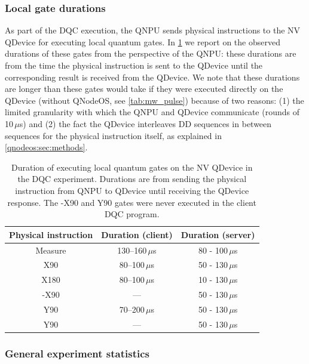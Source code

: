 \subsubsection{Local gate durations}

As part of the \ac{DQC} execution, the \ac{QNPU} sends physical instructions to the \ac{NV} \ac{QDevice} for executing local quantum gates. In \cref{tab:gate_durations} we report on the observed durations of these gates from the perspective of the \ac{QNPU}: these durations are from the time the physical instruction is sent to the \ac{QDevice} until the corresponding result is received from the \ac{QDevice}. We note that these durations are longer than these gates would take if they were executed directly on the \ac{QDevice} (without \ac{QNodeOS}, see \cref{tab:mw_pulse}) because of two reasons: (1) the limited granularity with which the \ac{QNPU} and \ac{QDevice} communicate (rounds of 10\,$\mu$s) and (2) the fact the \ac{QDevice} interleaves \ac{DD} sequences in between sequences for the physical instruction itself, as explained in \cref{qnodeos:sec:methods}.

\begin{table}[t]
    \centering
    \begin{tabular}{|c|c|c|}
    \hline
    \textbf{Physical instruction} & \textbf{Duration (client)} & \textbf{Duration (server)} \\ 
    \hline
    Measure & 130--160\,$\mu$s & 80 - 100\,$\mu$s \\
    X90 & 80--100\,$\mu$s & 50 - 130\,$\mu$s \\
    X180 & 80--100\,$\mu$s & 10 - 130\,$\mu$s \\
    -X90 & --- & 50 - 130\,$\mu$s \\
    Y90 & 70--200\,$\mu$s & 50 - 130\,$\mu$s \\
    Y90 & --- & 50 - 130\,$\mu$s \\
    \hline
    \end{tabular}
    \caption{Duration of executing local quantum gates on the \ac{NV} \ac{QDevice} in the \ac{DQC} experiment. Durations are from sending the physical instruction from \ac{QNPU} to \ac{QDevice} until receiving the \ac{QDevice} response. The -X90 and Y90 gates were never executed in the client \ac{DQC} program.}
    \label{tab:gate_durations}
\end{table}

\subsubsection{General experiment statistics}

